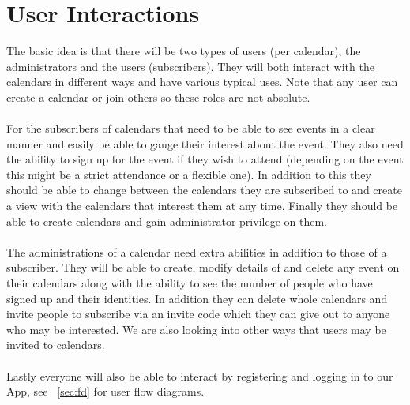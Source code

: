 \documentclass[10pt,a4paper]{article}
\begin{document}
\section{User Interactions} 
The basic idea is that there will be two types of users (per calendar), the administrators and the users (subscribers). They will both interact with the calendars in different ways and have various typical uses. Note that any user can create a calendar or join others so these roles are not absolute.
\\
\\
\noindent
For the subscribers of calendars that need to be able to see events in a clear manner and easily be able to gauge their interest about the event. They also need the ability to sign up for the event if they wish to attend (depending on the event this might be a strict attendance or a flexible one). In addition to this they should be able to change between the calendars they are subscribed to and create a view with the calendars that interest them at any time. Finally they should be able to create calendars and gain administrator privilege on them. 
\\
\\
\noindent
The administrations of a calendar need extra abilities in addition to those of a subscriber. They will be able to create, modify details of and delete any event on their calendars along with the ability to see the number of people who have signed up and their identities. In addition they can delete whole calendars and invite people to subscribe via an invite code which they can give out to anyone who may be interested. We are also looking into other ways that users may be invited to calendars.  
\\
\\
\noindent
Lastly everyone will also be able to interact by registering and logging in to our App, see ~\cref{sec:fd} for user flow diagrams.

\appendix
\label{appendix}
\end{document}
